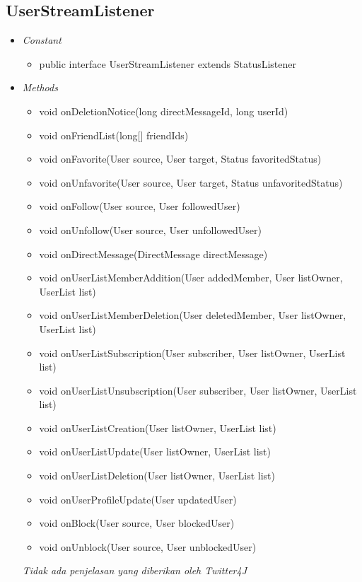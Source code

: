 	\subsection{UserStreamListener}
	\begin{itemize}
		\item \textit{Constant}
		
		\begin{itemize}
			\item public interface UserStreamListener
			extends StatusListener
		\end{itemize}
		\item \textit{Methods}
		
		\begin{itemize}
			\item void onDeletionNotice(long directMessageId, long userId)
			\item void onFriendList(long[] friendIds)
			\item void onFavorite(User source, User target, Status favoritedStatus)
			\item void onUnfavorite(User source, User target, Status unfavoritedStatus)
			\item void onFollow(User source, User followedUser)
			\item void onUnfollow(User source, User unfollowedUser)
			\item void onDirectMessage(DirectMessage directMessage)
			\item void onUserListMemberAddition(User addedMember, User listOwner, UserList list)
			\item void onUserListMemberDeletion(User deletedMember, User listOwner, UserList list)
			\item void onUserListSubscription(User subscriber, User listOwner, UserList list)
			\item void onUserListUnsubscription(User subscriber, User listOwner, UserList list)
			\item void onUserListCreation(User listOwner, UserList list)
			\item void onUserListUpdate(User listOwner, UserList list)
			\item void onUserListDeletion(User listOwner, UserList list)
			\item void onUserProfileUpdate(User updatedUser)
			\item void onBlock(User source, User blockedUser)
			\item void onUnblock(User source, User unblockedUser)
		\end{itemize}
	\textit{Tidak ada penjelasan yang diberikan oleh Twitter4J}
	\end{itemize}
	

